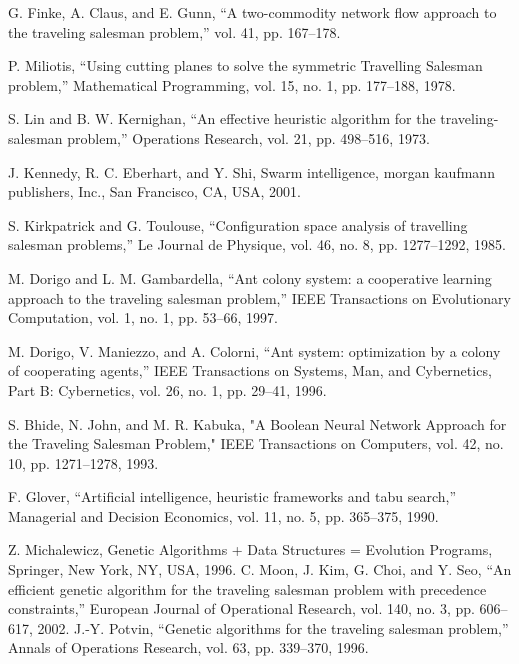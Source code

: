 \documentclass[11pt]{article}
\begin{document}
\begin{thebibliography}{10}


G. Finke, A. Claus, and E. Gunn, “A two-commodity network
flow approach to the traveling salesman problem,” vol. 41, pp.
167–178.

P. Miliotis, “Using cutting planes to solve the symmetric
Travelling Salesman problem,” Mathematical Programming, vol.
15, no. 1, pp. 177–188, 1978.

S. Lin and B. W. Kernighan, “An effective heuristic algorithm
for the traveling-salesman problem,” Operations Research, vol.
21, pp. 498–516, 1973.

 J. Kennedy, R. C. Eberhart, and Y. Shi, Swarm intelligence,
morgan kaufmann publishers, Inc., San Francisco, CA, USA,
2001.

S. Kirkpatrick and G. Toulouse, “Configuration space analysis of
travelling salesman problems,” Le Journal de Physique, vol. 46,
no. 8, pp. 1277–1292, 1985.

 M. Dorigo and L. M. Gambardella, “Ant colony system: a cooperative learning approach to the traveling salesman problem,”
IEEE Transactions on Evolutionary Computation, vol. 1, no. 1, pp.
53–66, 1997.

 M. Dorigo, V. Maniezzo, and A. Colorni, “Ant system: optimization by a colony of cooperating agents,” IEEE Transactions on
Systems, Man, and Cybernetics, Part B: Cybernetics, vol. 26, no.
1, pp. 29–41, 1996.

 S. Bhide, N. John, and M. R. Kabuka, "A Boolean Neural
Network Approach for the Traveling Salesman Problem," IEEE
Transactions on Computers, vol. 42, no. 10, pp. 1271–1278, 1993.

F. Glover, “Artificial intelligence, heuristic frameworks and tabu
search,” Managerial and Decision Economics, vol. 11, no. 5, pp.
365–375, 1990.

Z. Michalewicz, Genetic Algorithms + Data Structures = Evolution Programs, Springer, New York, NY, USA, 1996.
C. Moon, J. Kim, G. Choi, and Y. Seo, “An efficient genetic
algorithm for the traveling salesman problem with precedence
constraints,” European Journal of Operational Research, vol. 140,
no. 3, pp. 606–617, 2002.
 J.-Y. Potvin, “Genetic algorithms for the traveling salesman
problem,” Annals of Operations Research, vol. 63, pp. 339–370,
1996.


\end{thebibliography}
\end{document}
